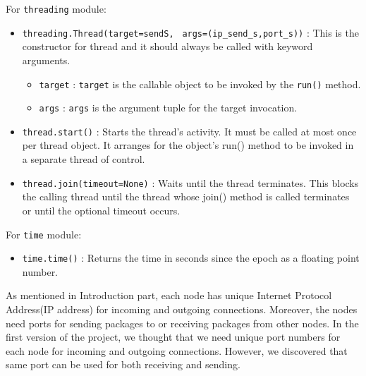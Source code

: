 \documentclass[conference]{IEEEtran}
\begin{document}
For \verb|threading| module:
\begin{itemize}

    \item \verb|threading.Thread(target=sendS,| \verb| args=(ip_send_s,port_s))| : This is the constructor for thread and it should always be called with keyword arguments.
        \begin{itemize}
        \item \verb|target| : \verb|target| is the callable object to be invoked by the \verb|run()| method.
        
        \item \verb|args| : \verb|args| is the argument tuple for the target invocation. \\
        \end{itemize}
    
    \item \verb|thread.start()| : Starts the thread’s activity. It must be called at most once per thread object. It arranges for the object’s run() method to be invoked in a separate thread of control. \\
        
    \item \verb|thread.join(timeout=None)| : Waits until the thread terminates. This blocks the calling thread until the thread whose join() method is called terminates or until the optional timeout occurs. \\
    
\end{itemize}

For \verb|time| module:
\begin{itemize}

    \item \verb|time.time()| : Returns the time in seconds since the epoch as a floating point number. \\

    
\end{itemize}

As mentioned in Introduction part, each node has unique Internet Protocol Address(IP address) for incoming and outgoing connections. Moreover, the nodes need ports for sending packages to or receiving packages from other nodes. In the first version of the project, we thought that we need unique port numbers for each node for incoming and outgoing connections. However, we discovered that same port can be used for both receiving and sending.\\
\end{document}
